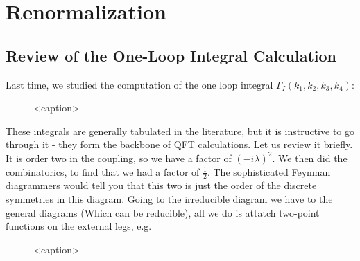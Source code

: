 \section{Renormalization}
\subsection{Review of the One-Loop Integral Calculation}
Last time, we studied the computation of the one loop integral $\Gamma_I(k_1, k_2, k_3, k_4)$:

\begin{figure}[htbp]
    \centering
    
    \caption{<caption>}
    \label{<label>}
\end{figure}

These integrals are generally tabulated in the literature, but it is instructive to go through it - they form the backbone of QFT calculations. Let us review it briefly. It is order two in the coupling, so we have a factor of $(-i\lambda)^2$. We then did the combinatorics, to find that we had a factor of $\frac{1}{2}$. The sophisticated Feynman diagrammers would tell you that this two is just the order of the discrete symmetries in this diagram. Going to the irreducible diagram we have to the general diagrams (Which can be reducible), all we do is attatch two-point functions on the external legs, e.g.

\begin{figure}[htbp]
    \centering
    
    \caption{<caption>}
    \label{<label>}
\end{figure}

